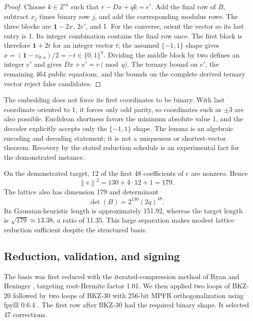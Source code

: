 \documentclass[11pt,a4paper]{article}
\newcommand{\Z}{\mathbb{Z}}
\newcommand{\norm}[1]{\left\lVert #1\right\rVert}
\begin{document}
\begin{proof}
Choose $k\in\Z^m$ such that $r-Dx+qk=e'$.  Add the final row of $B$, subtract
$x_j$ times binary row $j$, and add the corresponding modulus rows.  The
three blocks are $\mathbf{1}-2x$, $2e'$, and 1.  For the converse, orient the
vector so its last entry is 1.  Its integer combination contains the final
row once.  The first block is therefore $\mathbf{1}+2t$ for an integer vector
$t$; the assumed $\{-1,1\}$ shape gives
$x=(\mathbf{1}-v_{0:u})/2=-t\in\{0,1\}^u$.  Dividing the middle block by two
defines an integer $e'$ and gives $Dx+e'=r\pmod q$.  The ternary bound on
$e'$, the remaining 464 public equations, and the bounds on the complete
derived ternary vector
reject false candidates.
\end{proof}

The embedding does not force its first coordinates to be binary.  With last
coordinate oriented to 1, it forces only odd parity, so coordinates such as
$\pm3$ are also possible.  Euclidean shortness favors the minimum absolute
value 1, and the decoder explicitly accepts only the $\{-1,1\}$ shape.  The
lemma is an algebraic encoding and decoding statement; it is not a uniqueness
or shortest-vector theorem.  Recovery by the stated reduction schedule is an
experimental fact for the demonstrated instance.

On the demonstrated target, 12 of the first 48 coefficients of $e$ are
nonzero.  Hence
\begin{equation}
                    \norm{v}^2=130+4\cdot12+1=179.
\end{equation}
The lattice also has dimension 179 and determinant
\[
                         \det(B)=2^{130}(2q)^{48}.
\]
Its Gaussian-heuristic length is approximately 151.92, whereas the target
length is $\sqrt{179}\simeq13.38$, a ratio of 11.35.  This large separation
makes modest lattice reduction sufficient despite the structured basis.

\subsection{Reduction, validation, and signing}

The basis was first reduced with the iterated-compression method of Ryan and
Heninger \cite{RyanHeninger}, targeting root-Hermite factor 1.01.  We then
applied two loops of BKZ-20 followed by two loops of BKZ-30 with 256-bit MPFR
orthogonalization using fpylll 0.6.4 \cite{SchnorrEuchner,fpylll}.  The first
row after BKZ-30 had the required binary shape.  It selected 47 corrections.
\end{document}
